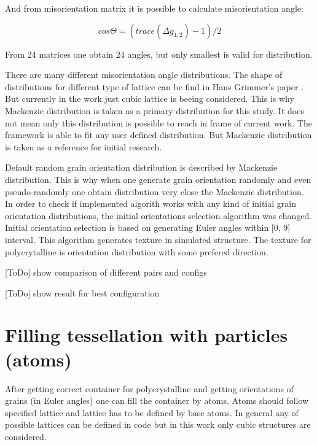 \documentclass[12pt]{report}
\begin{document}
And from misorientation matrix it is possible to calculate misorientation angle:

\begin{equation} \label{misangle}
cos\Theta = (trace(\Delta g_{1,2}) - 1)/2
\end{equation}
\bigbreak

From 24 matrices one obtain 24 angles, but only smallest is valid for distribution.

There are many different misorientation angle distributions. The shape of distributions for different type of lattice can be find in Hans Grimmer's paper \cite{hans79}. But currently in the work just cubic lattice is beeing considered. This is why Mackenzie distribution \cite{mack58} is taken as a primary distribution for this study. It does not mean only this distribution is possible to reach in frame of current work. The framework is able to fit any user defined distribution. But Mackenzie distribution is taken as a reference for initial research. 

Default random grain orientation distribution is described by Mackenzie distribution. This is why when one generate grain orientation randomly and even pseudo-randomly one obtain distribution very close the Mackenzie distribution. In order to check if implemented algorith works with any kind of initial grain orientation distributions, the initial orientations selection algorithm was changed. Initial orientation selection is based on generating Euler angles within [0\degree, 9\degree] interval. This algorithm generates texture in simulated structure. The texture for polycrytalline is orientation distribution with some prefered direction.



[ToDo] show comparison of different pairs and configs

[ToDo] show result for best configuration


\section{Filling tessellation with particles (atoms)}

After getting correct container for polycrystalline and getting orientations of grains (in Euler angles) one can fill the container by atoms. Atoms should follow specified lattice and lattice has to be defined by base atoms. In general any of possible lattices can be defined in code but in this work only cubic structures are considered.
\end{document}
